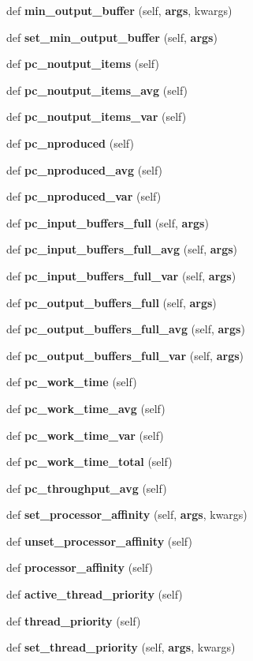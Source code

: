 \begin{DoxyCompactItemize}
\item 
def {\bf min\+\_\+output\+\_\+buffer} (self, {\bf args}, kwargs)
\item 
def {\bf set\+\_\+min\+\_\+output\+\_\+buffer} (self, {\bf args})
\item 
def {\bf pc\+\_\+noutput\+\_\+items} (self)
\item 
def {\bf pc\+\_\+noutput\+\_\+items\+\_\+avg} (self)
\item 
def {\bf pc\+\_\+noutput\+\_\+items\+\_\+var} (self)
\item 
def {\bf pc\+\_\+nproduced} (self)
\item 
def {\bf pc\+\_\+nproduced\+\_\+avg} (self)
\item 
def {\bf pc\+\_\+nproduced\+\_\+var} (self)
\item 
def {\bf pc\+\_\+input\+\_\+buffers\+\_\+full} (self, {\bf args})
\item 
def {\bf pc\+\_\+input\+\_\+buffers\+\_\+full\+\_\+avg} (self, {\bf args})
\item 
def {\bf pc\+\_\+input\+\_\+buffers\+\_\+full\+\_\+var} (self, {\bf args})
\item 
def {\bf pc\+\_\+output\+\_\+buffers\+\_\+full} (self, {\bf args})
\item 
def {\bf pc\+\_\+output\+\_\+buffers\+\_\+full\+\_\+avg} (self, {\bf args})
\item 
def {\bf pc\+\_\+output\+\_\+buffers\+\_\+full\+\_\+var} (self, {\bf args})
\item 
def {\bf pc\+\_\+work\+\_\+time} (self)
\item 
def {\bf pc\+\_\+work\+\_\+time\+\_\+avg} (self)
\item 
def {\bf pc\+\_\+work\+\_\+time\+\_\+var} (self)
\item 
def {\bf pc\+\_\+work\+\_\+time\+\_\+total} (self)
\item 
def {\bf pc\+\_\+throughput\+\_\+avg} (self)
\item 
def {\bf set\+\_\+processor\+\_\+affinity} (self, {\bf args}, kwargs)
\item 
def {\bf unset\+\_\+processor\+\_\+affinity} (self)
\item 
def {\bf processor\+\_\+affinity} (self)
\item 
def {\bf active\+\_\+thread\+\_\+priority} (self)
\item 
def {\bf thread\+\_\+priority} (self)
\item 
def {\bf set\+\_\+thread\+\_\+priority} (self, {\bf args}, kwargs)
\item 

\end{DoxyCompactItemize}

